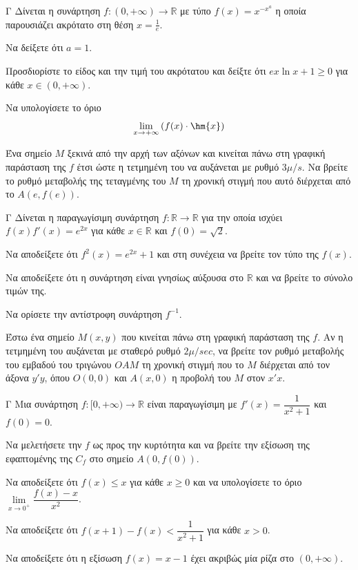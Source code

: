 \begin{thema}{Γ}
Δίνεται η συνάρτηση $f:(0,+\infty)\to\mathbb{R}$ με τύπο $f(x)=x^{-x^a}$ η οποία παρουσιάζει ακρότατο στη θέση $x=\frac{1}{e}$.
\begin{erwthma}
\item Να δείξετε ότι $a=1$.
\item Προσδιορίστε το είδος και την τιμή του ακρότατου και δείξτε ότι $ex\ln{x}+1\geq 0$ για κάθε $x\in(0,+\infty)$.
\item Να υπολογίσετε το όριο
\[ \lim\limits_{x\to+\infty}{\left(f(x)\cdot\hm{x}\right)} \]
\item Ένα σημείο $M$ ξεκινά από την αρχή των αξόνων και κινείται πάνω στη γραφική παράσταση της $f$ έτσι ώστε η τετμημένη του να αυξάνεται με ρυθμό $3\mu/\si{s}$. Να βρείτε το ρυθμό μεταβολής της τεταγμένης του $M$ τη χρονική στιγμή που αυτό διέρχεται από το $A\left(e,f(e)\right)$.
\end{erwthma}
\end{thema}

\begin{thema}{Γ}
Δίνεται η παραγωγίσιμη συνάρτηση $f: \mathbb{R} \to \mathbb{R}$ για την οποία ισχύει $f(x)f'(x) = e^{2x}$ για κάθε $x \in \mathbb{R}$ και $f(0) = \sqrt{2}$. 
\begin{erwthma}
  \item Να αποδείξετε ότι $f^2(x) = e^{2x} + 1$ και στη συνέχεια να βρείτε τον τύπο της $f(x)$.
  \item Να αποδείξετε ότι η συνάρτηση είναι γνησίως αύξουσα στο $\mathbb{R}$ και να βρείτε το σύνολο τιμών της.
  \item Να ορίσετε την αντίστροφη συνάρτηση $f^{-1}$.
  \item Έστω ένα σημείο $M(x, y)$ που κινείται πάνω στη γραφική παράσταση της $f$. Αν η τετμημένη του αυξάνεται με σταθερό ρυθμό $2 \mu/\si{sec}$, να βρείτε τον ρυθμό μεταβολής του εμβαδού του τριγώνου $OAM$ τη χρονική στιγμή που το $M$ διέρχεται από τον άξονα $y'y$, όπου $O(0,0)$ και $A(x, 0)$ η προβολή του $M$ στον $x'x$.
\end{erwthma}
\end{thema}

\begin{thema}{Γ}
Μια συνάρτηση $f: [0, +\infty) \to \mathbb{R}$ είναι παραγωγίσιμη με $f'(x) = \dfrac{1}{x^2+1}$ και $f(0) = 0$.
\begin{erwthma}
  \item Να μελετήσετε την $f$ ως προς την κυρτότητα και να βρείτε την εξίσωση της εφαπτομένης της $C_f$ στο σημείο $A(0, f(0))$.
  \item Να αποδείξετε ότι $f(x) \le x$ για κάθε $x \ge 0$ και να υπολογίσετε το όριο $\lim\limits_{x \to 0^+} \dfrac{f(x) - x}{x^2}$.
  \item Να αποδείξετε ότι $f(x+1) - f(x) < \dfrac{1}{x^2+1}$ για κάθε $x > 0$.
  \item Να αποδείξετε ότι η εξίσωση $f(x) = x - 1$ έχει ακριβώς μία ρίζα στο $(0, +\infty)$.
\end{erwthma}
\end{thema}

